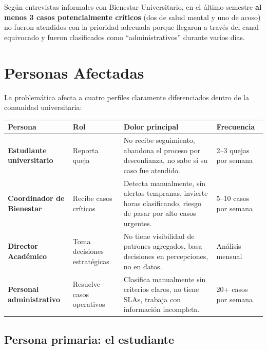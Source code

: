 \documentclass[11pt,a4paper]{article}
\begin{document}
\begin{tcolorbox}[colback=red!5!white, colframe=critical, title=\textbf{El problema m\'as grave}]
Seg\'un entrevistas informales con Bienestar Universitario, en el \'ultimo semestre \textbf{al menos 3 casos potencialmente cr\'iticos} (dos de salud mental y uno de acoso) no fueron atendidos con la prioridad adecuada porque llegaron a trav\'es del canal equivocado y fueron clasificados como ``administrativos'' durante varios d\'ias.
\end{tcolorbox}

\section{Personas Afectadas}

La problem\'atica afecta a cuatro perfiles claramente diferenciados dentro de la comunidad universitaria:

\begin{longtable}{|p{3.5cm}|p{3.5cm}|p{5.5cm}|p{2.5cm}|}
\hline
\rowcolor{primary!20}
\textbf{Persona} & \textbf{Rol} & \textbf{Dolor principal} & \textbf{Frecuencia} \\
\hline
\endhead

\textbf{Estudiante universitario} 
& Reporta queja 
& No recibe seguimiento, abandona el proceso por desconfianza, no sabe si su caso fue atendido. 
& 2--3 quejas por semana \\
\hline

\textbf{Coordinador de Bienestar} 
& Recibe casos cr\'iticos 
& Detecta manualmente, sin alertas tempranas, invierte horas clasificando, riesgo de pasar por alto casos urgentes. 
& 5--10 casos por semana \\
\hline

\textbf{Director Acad\'emico} 
& Toma decisiones estrat\'egicas 
& No tiene visibilidad de patrones agregados, basa decisiones en percepciones, no en datos. 
& An\'alisis mensual \\
\hline

\textbf{Personal administrativo} 
& Resuelve casos operativos 
& Clasifica manualmente sin criterios claros, no tiene SLAs, trabaja con informaci\'on incompleta. 
& 20+ casos por semana \\
\hline
\end{longtable}

\subsection{Persona primaria: el estudiante}
\end{document}
